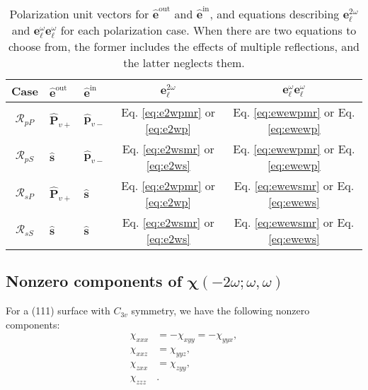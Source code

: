 \begin{table}[b]
\centering
\begin{tabular}{ | c l l | c | c | }
\hline
Case               & $\hat{\mathbf{e}}^{\mathrm{out}}$
                   & $\hat{\mathbf{e}}^{\mathrm{in}}$
                   & $\mathbf{e}^{2\omega}_{\ell}$
                   & $\mathbf{e}^{\omega}_{\ell}\mathbf{e}^{\omega}_{\ell}$ \\
\hline
$\mathcal{R}_{pP}$ & $\hat{\mathbf{P}}_{v+}$
                   & $\hat{\mathbf{p}}_{v-}$
                   &  Eq. \eqref{eq:e2wpmr} or \eqref{eq:e2wp}
                   & Eq. \eqref{eq:ewewpmr} or Eq. \eqref{eq:ewewp} \\
$\mathcal{R}_{pS}$ & $\hat{\mathbf{s}}$
                   & $\hat{\mathbf{p}}_{v-}$
                   &  Eq. \eqref{eq:e2wsmr} or \eqref{eq:e2ws}
                   & Eq. \eqref{eq:ewewpmr} or Eq. \eqref{eq:ewewp} \\
$\mathcal{R}_{sP}$ & $\hat{\mathbf{P}}_{v+}$
                   & $\hat{\mathbf{s}}$
                   &  Eq. \eqref{eq:e2wpmr} or \eqref{eq:e2wp}
                   & Eq. \eqref{eq:ewewsmr} or Eq. \eqref{eq:ewews} \\
$\mathcal{R}_{sS}$ & $\hat{\mathbf{s}}$
                   & $\hat{\mathbf{s}}$
                   &  Eq. \eqref{eq:e2wsmr} or \eqref{eq:e2ws}
                   & Eq. \eqref{eq:ewewsmr} or Eq. \eqref{eq:ewews} \\
\hline
\end{tabular}
\caption{Polarization unit vectors for $\hat{\mathbf{e}}^{\mathrm{out}}$ and
$\hat{\mathbf{e}}^{\mathrm{in}}$, and equations describing
$\mathbf{e}^{2\omega}_{\ell}$ and
$\mathbf{e}^{\omega}_{\ell}\mathbf{e}^{\omega}_{\ell}$ for each polarization
case. When there are two equations to choose from, the former includes the
effects of multiple reflections, and the latter neglects
them.\label{tab:review}}
\end{table}


\subsection{Nonzero components of \texorpdfstring{$\boldsymbol{\chi}(-2\omega;
\omega, \omega)$}{X(2w;-w,w)}}

For a (111) surface with $C_{3v}$ symmetry, we have the following nonzero
components: 
\begin{equation}\label{eq:nonzero111}
\begin{split}
\chi_{xxx}&=-\chi_{xyy}=-\chi_{yyx},\\
\chi_{xxz}&=\chi_{yyz},\\
\chi_{zxx}&=\chi_{zyy},\\
\chi_{zzz}&.
\end{split}
\end{equation}


